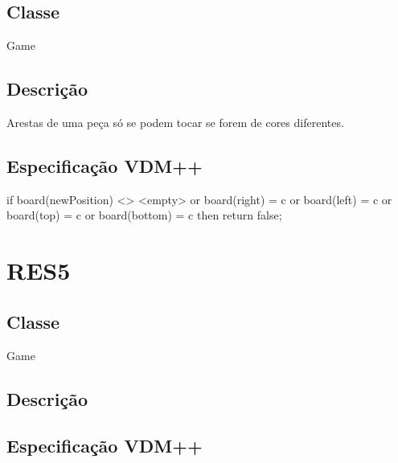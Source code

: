 \subsection{Classe}
Game
\subsection{Descrição}
Arestas de uma peça só se podem tocar se forem de cores diferentes.
\subsection{Especificação VDM++}
\begin{vdm_al}
if board(newPosition) <> <empty> or board(right) = c or board(left) = c 
	or board(top) = c or board(bottom) = c then 
return false;
\end{vdm_al}

\section{RES5}
\subsection{Classe}
Game
\subsection{Descrição}
\subsection{Especificação VDM++}
\begin{vdm_al}
\end{vdm_al}
